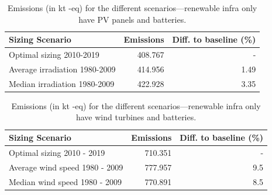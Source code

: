  \begin{table}[H]   
  \caption{Emissions (in kt -eq) for the different scenarios---renewable infra only have PV panels and batteries.} \centering

   \label{tab:co2_10y_pv_only}
  
      \begin{tabular}{|l|r|r|}        
        \hline
        \textbf{Sizing Scenario} &  \textbf{Emissions } & \textbf{Diff. to baseline (\%) } \\
       \hline        
        Optimal sizing 2010-2019       &       408.767 &  -       \\
        \hline     
        Average irradiation 1980-2009  &       414.956 &  1.49    \\
        \hline
        Median irradiation  1980-2009  &       422.928 &  3.35   \\
        \hline        
      \end{tabular}
      
    \end{table}


    
 \begin{table}[H]   
  \caption{Emissions (in kt -eq) for the different scenarios---renewable infra only have wind turbines and batteries.} \centering

   \label{tab:co2_10y_wt_only}
  
      \begin{tabular}{|l|r|r|}        
        \hline
        \textbf{Sizing Scenario} &  \textbf{Emissions } & \textbf{Diff. to baseline (\%) } \\
        
        \hline
        Optimal sizing 2010 - 2019       &       710.351 &  -        \\
        \hline     
        Average wind speed 1980 - 2009  &       777.957 &  9.5      \\
        \hline 
        Median wind speed  1980 - 2009  &       770.891 &  8.5      \\
        \hline        
      \end{tabular}      
    \end{table}

